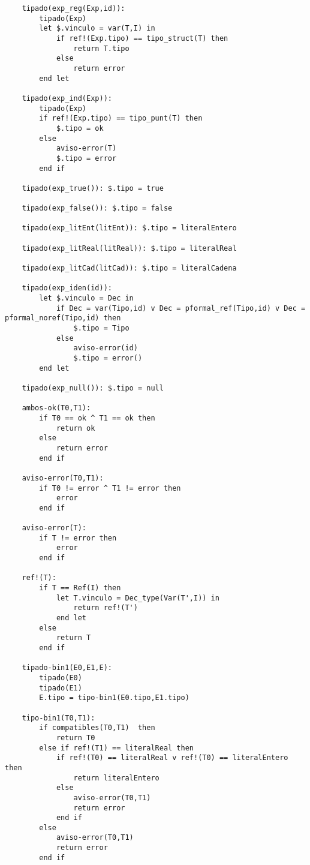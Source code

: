 \begin{lstlisting}
    tipado(exp_reg(Exp,id)):
        tipado(Exp)
        let $.vinculo = var(T,I) in
            if ref!(Exp.tipo) == tipo_struct(T) then
                return T.tipo
            else 
                return error
        end let

    tipado(exp_ind(Exp)):
        tipado(Exp)
        if ref!(Exp.tipo) == tipo_punt(T) then
            $.tipo = ok
        else
            aviso-error(T)
            $.tipo = error
        end if

    tipado(exp_true()): $.tipo = true

    tipado(exp_false()): $.tipo = false

    tipado(exp_litEnt(litEnt)): $.tipo = literalEntero

    tipado(exp_litReal(litReal)): $.tipo = literalReal

    tipado(exp_litCad(litCad)): $.tipo = literalCadena

    tipado(exp_iden(id)):
        let $.vinculo = Dec in
            if Dec = var(Tipo,id) v Dec = pformal_ref(Tipo,id) v Dec = pformal_noref(Tipo,id) then
                $.tipo = Tipo
            else
                aviso-error(id)
                $.tipo = error()
        end let

    tipado(exp_null()): $.tipo = null

    ambos-ok(T0,T1):
        if T0 == ok ^ T1 == ok then
            return ok
        else 
            return error
        end if

    aviso-error(T0,T1):
        if T0 != error ^ T1 != error then
            error
        end if

    aviso-error(T):
        if T != error then
            error
        end if 

    ref!(T):
        if T == Ref(I) then
            let T.vinculo = Dec_type(Var(T',I)) in
                return ref!(T')
            end let
        else
            return T
        end if

    tipado-bin1(E0,E1,E):
        tipado(E0)
        tipado(E1)
        E.tipo = tipo-bin1(E0.tipo,E1.tipo)

    tipo-bin1(T0,T1):
        if compatibles(T0,T1)  then
            return T0
        else if ref!(T1) == literalReal then
            if ref!(T0) == literalReal v ref!(T0) == literalEntero then
                return literalEntero
            else 
                aviso-error(T0,T1)
                return error
            end if
        else
            aviso-error(T0,T1)
            return error
        end if


\end{lstlisting}
